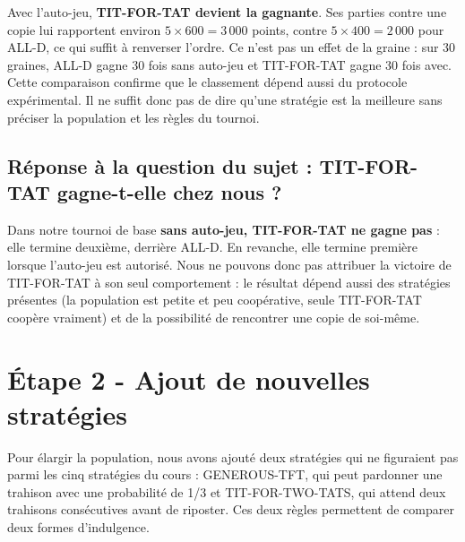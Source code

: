 \documentclass[10pt,a4paper]{article}
\begin{document}
Avec l'auto-jeu, \textbf{TIT-FOR-TAT devient la gagnante}. Ses parties contre une copie lui rapportent environ
$5\times600=3\,000$ points, contre $5\times400=2\,000$ pour ALL-D, ce qui suffit à renverser l'ordre. Ce n'est pas un effet de
la graine : sur 30 graines, ALL-D gagne 30 fois sans auto-jeu et TIT-FOR-TAT gagne 30 fois avec. Cette comparaison confirme que le
classement dépend aussi du protocole expérimental. Il ne suffit donc pas de dire qu'une stratégie est \og la meilleure \fg{}
sans préciser la population et les règles du tournoi.

\subsection{Réponse à la question du sujet : TIT-FOR-TAT gagne-t-elle chez nous ?}
Dans notre tournoi de base \textbf{sans auto-jeu, TIT-FOR-TAT ne gagne pas} : elle termine deuxième, derrière ALL-D. En revanche,
elle termine première lorsque l'auto-jeu est autorisé. Nous ne pouvons donc pas attribuer la victoire de TIT-FOR-TAT à son seul
comportement : le résultat dépend aussi des stratégies présentes (la population est petite et peu coopérative, seule
TIT-FOR-TAT coopère vraiment) et de la possibilité de rencontrer une copie de soi-même.

\section{Étape 2 - Ajout de nouvelles stratégies}
Pour élargir la population, nous avons ajouté deux stratégies qui ne figuraient pas parmi les cinq stratégies du cours :
GENEROUS-TFT, qui peut pardonner une trahison avec une probabilité de 1/3 et TIT-FOR-TWO-TATS, qui attend deux trahisons
consécutives avant de riposter. Ces deux règles permettent de comparer deux formes d'indulgence.
\end{document}
